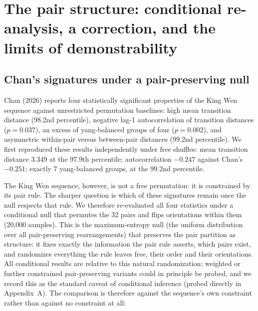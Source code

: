 \documentclass[11pt]{article}
\begin{document}
\section{The pair structure: conditional re-analysis, a correction, and the limits of demonstrability}
\label{sec:pairs}

\subsection{Chan's signatures under a pair-preserving null}
\label{sec:chan}

Chan (2026) reports four statistically significant properties of the King Wen sequence against unrestricted permutation baselines: high mean transition distance (98.2nd percentile), negative lag-1 autocorrelation of transition distances ($p = 0.037$), an excess of yang-balanced groups of four ($p = 0.002$), and asymmetric within-pair versus between-pair distances (99.2nd percentile). We first reproduced these results independently under free shuffles: mean transition distance 3.349 at the 97.9th percentile; autocorrelation $-0.247$ against Chan's $-0.251$; exactly 7 yang-balanced groups, at the 99.2nd percentile.

The King Wen sequence, however, is not a free permutation: it is constrained by its pair rule. The sharper question is which of these signatures remain once the null respects that rule. We therefore re-evaluated all four statistics under a conditional null that permutes the 32 pairs and flips orientations within them (20,000 samples). This is the maximum-entropy null (the uniform distribution over all pair-preserving rearrangements) that preserves the pair partition as structure: it fixes exactly the information the pair rule asserts, which pairs exist, and randomizes everything the rule leaves free, their order and their orientations. All conditional results are relative to this natural randomization; weighted or further constrained pair-preserving variants could in principle be probed, and we record this as the standard caveat of conditional inference (probed directly in Appendix~A). The comparison is therefore against the sequence's own constraint rather than against no constraint at all:
\end{document}
